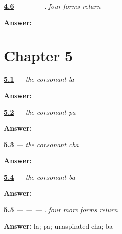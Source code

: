 \noindent\begin{minipage}[t]{\linewidth}
\raggedright
\hyperlink{review-GU-R04-first-four-r1-dictation}{\textbf{4.6}} \emph{ —  —  — : four forms return}\par
\small \textbf{Answer:}    \par
\end{minipage}\par\medskip

\section*{Chapter 5}

\noindent\begin{minipage}[t]{\linewidth}
\raggedright
\hyperlink{review-GU-W05-la-recall}{\textbf{5.1}} \emph{ — the consonant la}\par
\small \textbf{Answer:} \par
\end{minipage}\par\medskip

\noindent\begin{minipage}[t]{\linewidth}
\raggedright
\hyperlink{review-GU-W05-pa-recall}{\textbf{5.2}} \emph{ — the consonant pa}\par
\small \textbf{Answer:} \par
\end{minipage}\par\medskip

\noindent\begin{minipage}[t]{\linewidth}
\raggedright
\hyperlink{review-GU-W05-cha-recall}{\textbf{5.3}} \emph{ — the consonant cha}\par
\small \textbf{Answer:} \par
\end{minipage}\par\medskip

\noindent\begin{minipage}[t]{\linewidth}
\raggedright
\hyperlink{review-GU-W05-ba-recall}{\textbf{5.4}} \emph{ — the consonant ba}\par
\small \textbf{Answer:} \par
\end{minipage}\par\medskip

\noindent\begin{minipage}[t]{\linewidth}
\raggedright
\hyperlink{review-GU-R05-second-four-r1-reading}{\textbf{5.5}} \emph{ —  —  — : four more forms return}\par
\small \textbf{Answer:} la; pa; unaspirated cha; ba\par
\end{minipage}\par\medskip

